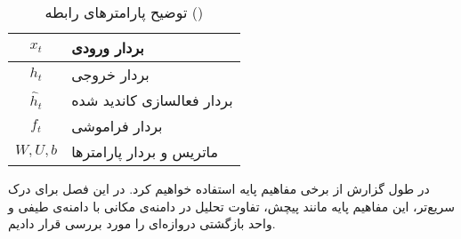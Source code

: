 \begin{table}[h]
  \centering
  \caption{توضیح پارامترهای رابطه ()}
  \begin{tabular}{|c|p{}|}
    \hline
    $x_{t}$ & بردار ورودی \\
    \hline
    $h_{t}$ & بردار خروجی \\
    \hline
    ${\hat {h}}_{t}$ & بردار فعالسازی کاندید شده \\
    \hline
    $f_{t}$ & بردار فراموشی \\
    \hline
    $W, U ,b$ & ماتریس و بردار پارامترها \\
    \hline
  \end{tabular}
  \label{tbl:distance}
\end{table}

در طول گزارش از برخی مفاهیم پایه استفاده خواهیم کرد. در این فصل برای درک سریع‌تر، این مفاهیم پایه مانند پیچش، تفاوت تحلیل در دامنه‌ی مکانی با دامنه‌ی طیفی و واحد بازگشتی دروازه‌ای را مورد بررسی قرار دادیم.

